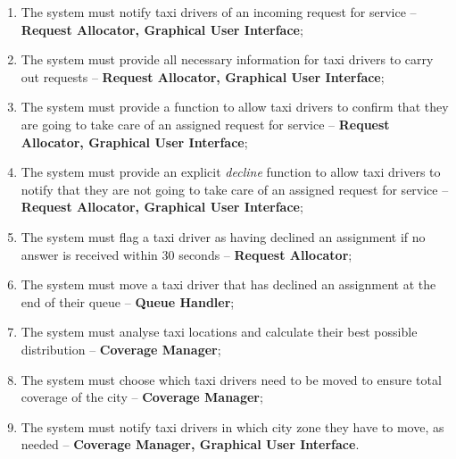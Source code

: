 \begin{enumerate}
\item The system must notify taxi drivers of an incoming request for service -- \textbf{Request Allocator, Graphical User Interface};
\item The system must provide all necessary information for taxi drivers to carry out requests -- \textbf{Request Allocator, Graphical User Interface};

\item The system must provide a function to allow taxi drivers to confirm that they are going to take care of an assigned request for service -- \textbf{Request Allocator, Graphical User Interface};
\item The system must provide an explicit \emph{decline} function to allow taxi drivers to notify that they are not going to take care of an assigned request for service -- \textbf{Request Allocator, Graphical User Interface};
\item The system must flag a taxi driver as having declined an assignment if no answer is received within 30 seconds -- \textbf{Request Allocator};
\item The system must move a taxi driver that has declined an assignment at the end of their queue -- \textbf{Queue Handler};

\item The system must analyse taxi locations and calculate their best possible distribution -- \textbf{Coverage Manager};
\item The system must choose which taxi drivers need to be moved to ensure total coverage of the city -- \textbf{Coverage Manager};
\item The system must notify taxi drivers in which city zone they have to move, as needed -- \textbf{Coverage Manager, Graphical User Interface}.
\end{enumerate}
